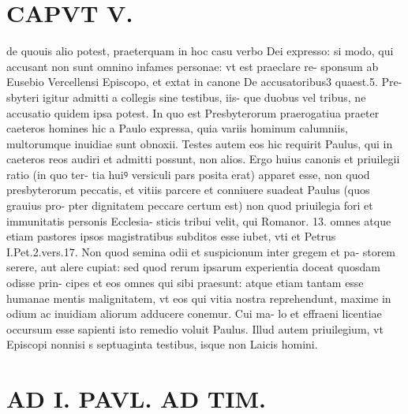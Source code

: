 \documentclass{article}
\begin{document}
\begin{pages}
\section*{CAPVT  V. }
\marginpar{[ p.815 ]}\pstart de quouis alio potest, praeterquam in hoc casu verbo Dei expresso: si modo, qui accusant non sunt omnino infames personae: vt est praeclare re- sponsum ab Eusebio Vercellensi Episcopo, et extat in canone De accusatoribus3 quaest.5. Pre- sbyteri igitur admitti a collegis sine testibus, iis- que duobus vel tribus, ne accusatio quidem ipsa potest. In quo est Presbyterorum praerogatiua praeter caeteros homines hic a Paulo expressa, quia variis hominum calumniis, multorumque inuidiae sunt obnoxii. Testes autem eos hic requirit Paulus, qui in caeteros reos audiri et admitti possunt, non alios. Ergo huius canonis et priuilegii ratio (in quo ter- tia huiꝰ versiculi pars posita erat) apparet esse, non quod presbyterorum peccatis, et vitiis parcere et conniuere suadeat Paulus (quos grauius pro- pter dignitatem peccare certum est) non quod priuilegia fori et immunitatis personis Ecclesia- sticis tribui velit, qui Romanor. 13. omnes atque etiam pastores ipsos magistratibus subditos esse iubet, vti et Petrus I.Pet.2.vers.17. Non quod semina odii et suspicionum inter gregem et pa- storem serere, aut alere cupiat: sed quod rerum ipsarum experientia doceat quosdam odisse prin- cipes et eos omnes qui sibi praesunt: atque etiam tantam esse humanae mentis malignitatem, vt eos qui vitia nostra reprehendunt, maxime in odium ac inuidiam aliorum adducere conemur. Cui ma- lo et effraeni licentiae occursum esse sapienti isto remedio voluit Paulus. Illud autem priuilegium, vt Episcopi nonnisi s septuaginta testibus, isque non Laicis homini.  \pend
\section*{AD I. PAVL. AD TIM. }
\marginpar{[ p.310 ]}\pstart {}
{}

\end{pages}
\end{document}
